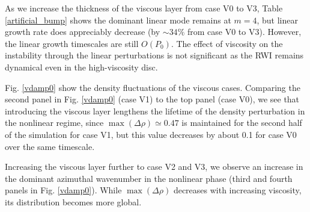 As we increase the thickness of the viscous layer from case V0 to V3, 
Table \ref{artificial_bump} shows the dominant linear mode remains at
$m=4$, but linear growth rate does appreciably decrease 
(by $\sim 34\%$ from case V0 to V3). However, the linear growth timescales
are still $O(P_0)$.  
The effect of viscosity on the instability through the linear
perturbations is not significant as the RWI remains dynamical even in
the high-viscosity disc.   

Fig. \ref{vdamp0} show the density fluctuations of the
viscous cases. Comparing the second panel in Fig. \ref{vdamp0} (case
V1) to the top panel (case V0), we see that introducing the
viscous layer lengthens the lifetime of the density perturbation in the
nonlinear regime, since $\max(\Delta\rho)\simeq 0.47$ is maintained for
the second half of the simulation for case V1, but this value decreases
by about 0.1 for case V0 over the same timescale. 

Increasing the viscous layer further to case V2 and V3, we observe an
increase in the dominant azimuthal wavenumber in the nonlinear phase
(third and fourth panels in Fig. \ref{vdamp0}).  While
$\max(\Delta\rho)$ decreases with increasing viscosity, its
distribution becomes more global. %

